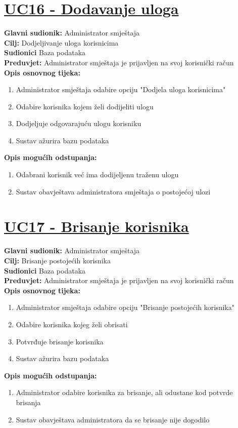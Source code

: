 \documentclass{article}
\begin{document}
	\section* {\underline{UC16 - Dodavanje uloga}}
	\textbf{Glavni sudionik:} Administrator smještaja \\
	\textbf{Cilj:} Dodjeljivanje uloga korisnicima\\
	\textbf{Sudionici} Baza podataka \\
	\textbf{Preduvjet:} Administrator smještaja je prijavljen na svoj korisnički račun \\
	\textbf{Opis osnovnog tijeka:}
	\begin{enumerate}
		\item Administrator smještaja odabire opciju "Dodjela uloga korisnicima"
		\item Odabire korisnika kojem želi dodijeliti ulogu
		\item Dodjeljuje odgovarajuću ulogu korisniku
		\item Sustav ažurira bazu podataka
	\end{enumerate}
	\textbf{Opis mogućih odstupanja:}
	\begin{enumerate}
		\item Odabrani korisnik već ima dodijeljenu traženu ulogu
		\item Sustav obavještava administratora smještaja o postojećoj ulozi
	\end{enumerate}
	
	\section* {\underline{UC17 - Brisanje korisnika}}
	\textbf{Glavni sudionik:} Administrator smještaja \\
	\textbf{Cilj:} Brisanje postojećih korisnika\\
	\textbf{Sudionici} Baza podataka \\
	\textbf{Preduvjet:} Administrator smještaja je prijavljen na svoj korisnički račun \\
	\textbf{Opis osnovnog tijeka:}
	\begin{enumerate}
		\item Administrator smještaja odabire opciju "Brisanje postojećih korisnika"
		\item Odabire korisnika kojeg želi obrisati
		\item Potvrđuje brisanje korisnika
		\item Sustav ažurira bazu podataka
	\end{enumerate}
	\textbf{Opis mogućih odstupanja:}
	\begin{enumerate}
		\item Administrator odabire korisnika za brisanje, ali odustane kod potvrde brisanja
		\item Sustav obavještava administratora da se brisanje nije dogodilo
	\end{enumerate}
	
\end{document}
